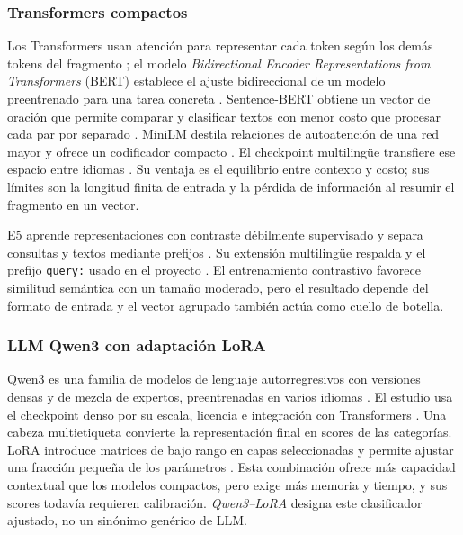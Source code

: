 \subsubsection{Transformers compactos}

Los Transformers usan atención para representar cada token según los demás tokens del fragmento \cite{vaswani2017attention}; el modelo \emph{Bidirectional Encoder Representations from Transformers} (BERT) establece el ajuste bidireccional de un modelo preentrenado para una tarea concreta \cite{devlin2019bert}. Sentence-BERT obtiene un vector de oración que permite comparar y clasificar textos con menor costo que procesar cada par por separado \cite{reimers2019sbert}. MiniLM destila relaciones de autoatención de una red mayor y ofrece un codificador compacto \cite{wang2020minilm}. El checkpoint multilingüe  transfiere ese espacio entre idiomas \cite{reimers2020multilingual,hf2026minilmcard}. Su ventaja es el equilibrio entre contexto y costo; sus límites son la longitud finita de entrada y la pérdida de información al resumir el fragmento en un vector.

E5 aprende representaciones con contraste débilmente supervisado y separa consultas y textos mediante prefijos \cite{wang2022e5}. Su extensión multilingüe respalda  y el prefijo \texttt{query:} usado en el proyecto \cite{wang2024e5,hf2026e5card}. El entrenamiento contrastivo favorece similitud semántica con un tamaño moderado, pero el resultado depende del formato de entrada y el vector agrupado también actúa como cuello de botella.

\subsubsection{LLM Qwen3 con adaptación LoRA}

Qwen3 es una familia de modelos de lenguaje autorregresivos con versiones densas y de mezcla de expertos, preentrenadas en varios idiomas \cite{qwen2025qwen3}. El estudio usa el checkpoint denso  por su escala, licencia e integración con Transformers \cite{hf2026qwen06bcard}. Una cabeza multietiqueta convierte la representación final en scores de las categorías. LoRA introduce matrices de bajo rango en capas seleccionadas y permite ajustar una fracción pequeña de los parámetros \cite{hu2022lora}. Esta combinación ofrece más capacidad contextual que los modelos compactos, pero exige más memoria y tiempo, y sus scores todavía requieren calibración. \emph{Qwen3--LoRA} designa este clasificador ajustado, no un sinónimo genérico de LLM.

